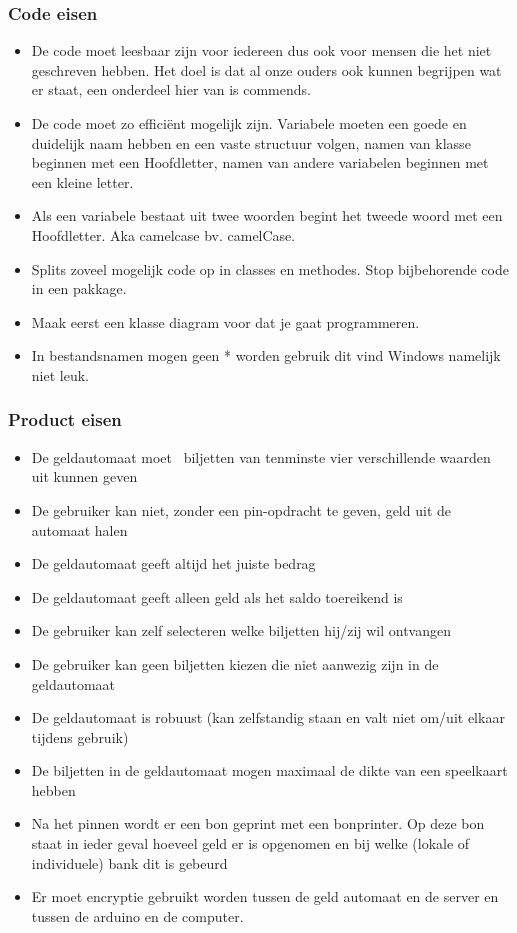 \documentclass{article}
\begin{document}
\subsubsection{Code eisen}
\begin{itemize}
\item De code moet leesbaar zijn voor iedereen dus ook voor mensen die het niet geschreven hebben. Het doel is dat al onze ouders ook kunnen begrijpen wat er staat, een onderdeel hier van is commends.
\item De code moet zo efficiënt mogelijk zijn.
Variabele moeten een goede en duidelijk naam hebben en een vaste structuur volgen, namen van klasse beginnen met een Hoofdletter, namen van andere variabelen beginnen met een kleine letter. 
	\item Als een variabele bestaat uit twee woorden begint het tweede woord met een Hoofdletter. Aka camelcase bv. camelCase.
	\item Splits zoveel mogelijk code op in classes en methodes. Stop bijbehorende code in een pakkage.
	\item Maak eerst een klasse diagram voor dat je gaat programmeren.
	\item In bestandsnamen mogen geen * worden gebruik dit vind Windows namelijk niet leuk.
\end{itemize}
\subsubsection{Product eisen}
\begin{itemize}
	\item De geldautomaat moet  biljetten van tenminste vier verschillende waarden uit kunnen geven
	\item De gebruiker kan niet, zonder een pin-opdracht te geven, geld uit de automaat halen
	\item De geldautomaat geeft altijd het juiste bedrag
	\item De geldautomaat geeft alleen geld als het saldo toereikend is
	\item De gebruiker kan zelf selecteren welke biljetten hij/zij wil ontvangen
	\item De gebruiker kan geen biljetten kiezen die niet aanwezig zijn in de geldautomaat
	\item De geldautomaat is robuust (kan zelfstandig staan en valt niet om/uit elkaar tijdens 	gebruik)
	\item De biljetten in de geldautomaat mogen maximaal de dikte van een speelkaart hebben
	\item Na het pinnen wordt er een bon geprint met een bonprinter. Op deze bon staat in ieder 	geval hoeveel geld er is opgenomen en bij welke (lokale of individuele) bank dit is gebeurd
	\item Er moet encryptie gebruikt worden tussen de geld automaat en de server en tussen de 	arduino en de computer.
\end{itemize}
\end{document}
